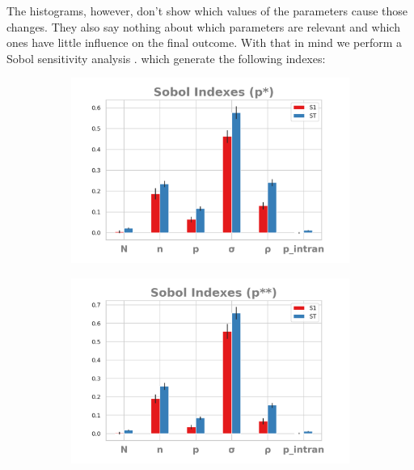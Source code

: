 \documentclass{article}
\begin{document}
    The histograms, however, don't show which values of the parameters cause
    those changes. They also say nothing about which parameters are relevant and
    which ones have little influence on the final outcome. With that in mind we
    perform a Sobol sensitivity analysis
    \cite{saltelli2000sensitivity}. %
    which generate the following indexes:

     
    \begin{figure}[H]
  \centering
    \begin{subfigure}[b]{0.45\textwidth}
      \includegraphics[width=\textwidth]{img/sobolpstar1.png}
    \end{subfigure}
    \begin{subfigure}[b]{0.45\textwidth}
      \includegraphics[width=\textwidth]{img/sobolpstar2.png}

\end{subfigure}
\end{figure}
\end{document}
